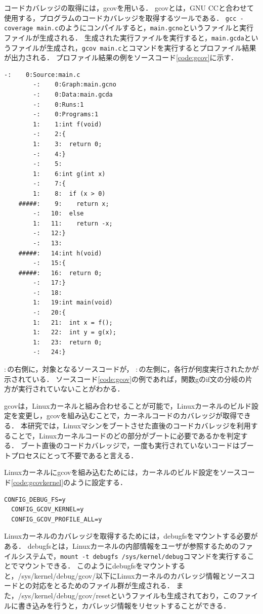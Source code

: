 \documentclass[graduation-thesis]{mlarticle}
\begin{document}
コードカバレッジの取得には，gcovを用いる．
gcovとは，GNU CCと合わせて使用する，プログラムのコードカバレッジを取得するツールである．
\texttt{gcc -coverage main.c}のようにコンパイルすると，\texttt{main.gcno}というファイルと実行ファイルが生成される．
生成された実行ファイルを実行すると，\texttt{main.gcda}というファイルが生成され，\texttt{gcov main.c}とコマンドを実行するとプロファイル結果が出力される．
プロファイル結果の例をソースコード\ref{code:gcov}に示す．

\begin{lstlisting}[caption=gcovの実行結果例, label=code:gcov]
        -:    0:Source:main.c
        -:    0:Graph:main.gcno
        -:    0:Data:main.gcda
        -:    0:Runs:1
        -:    0:Programs:1
        1:    1:int f(void)
        -:    2:{
        1:    3:  return 0;
        -:    4:}
        -:    5:
        1:    6:int g(int x)
        -:    7:{
        1:    8:  if (x > 0)
    #####:    9:    return x;
        -:   10:  else
        1:   11:    return -x;
        -:   12:}
        -:   13:
    #####:   14:int h(void)
        -:   15:{
    #####:   16:  return 0;
        -:   17:}
        -:   18:
        1:   19:int main(void)
        -:   20:{
        1:   21:  int x = f();
        1:   22:  int y = g(x);
        1:   23:  return 0;
        -:   24:}
\end{lstlisting}

$:$の右側に，対象となるソースコードが，
$:$の左側に，各行が何度実行されたかが示されている．
ソースコード\ref{code:gcov}の例であれば，関数gのif文の分岐の片方が実行されていないことがわかる．

gcovは，Linuxカーネルと組み合わせることが可能で，Linuxカーネルのビルド設定を変更し，gcovを組み込むことで，カーネルコードのカバレッジが取得できる．
本研究では，Linuxマシンをブートさせた直後のコードカバレッジを利用することで，Linuxカーネルコードのどの部分がブートに必要であるかを判定する．
ブート直後のコードカバレッジで，一度も実行されていないコードはブートプロセスにとって不要であると言える．

Linuxカーネルにgcovを組み込むためには，カーネルのビルド設定をソースコード\ref{code:gcovkernel}のように設定する．

\begin{lstlisting}[caption=gcovを組み込むLinuxカーネルの設定, label=code:gcovkernel]
  CONFIG_DEBUG_FS=y
  CONFIG_GCOV_KERNEL=y
  CONFIG_GCOV_PROFILE_ALL=y
\end{lstlisting}

Linuxカーネルのカバレッジを取得するためには，debugfsをマウントする必要がある．
debugfsとは，Linuxカーネルの内部情報をユーザが参照するためのファイルシステムで，\texttt{mount -t debugfs /sys/kernel/debug}コマンドを実行することでマウントできる．
このようにdebugfsをマウントすると，/sys/kernel/debug/gcov/以下にLinuxカーネルのカバレッジ情報とソースコードとの対応をとるためのファイル群が生成される．
また，/sys/kernel/debug/gcov/resetというファイルも生成されており，このファイルに書き込みを行うと，カバレッジ情報をリセットすることができる．
\end{document}

